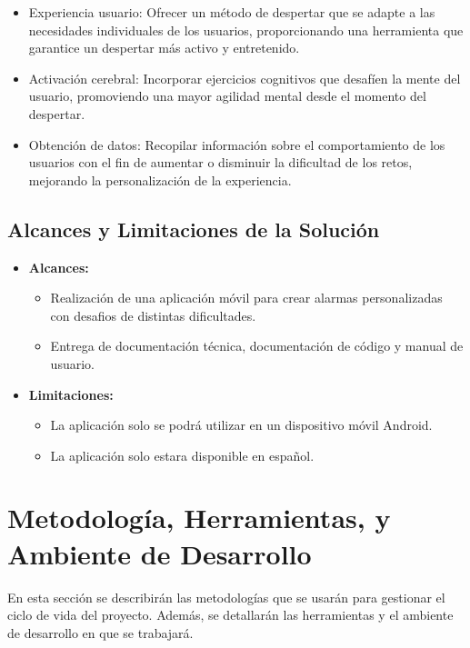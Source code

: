 \documentclass[letterpaper, 10pt]{article}
\begin{document}
\begin{itemize}
    \item Experiencia usuario: Ofrecer un método de despertar que se adapte a las necesidades individuales de los usuarios, proporcionando una herramienta que garantice un despertar más activo y entretenido.
    \item Activación cerebral: Incorporar ejercicios cognitivos que desafíen la mente del usuario, promoviendo una mayor agilidad mental desde el momento del despertar.
    \item Obtención de datos: Recopilar información sobre el comportamiento de los usuarios con el fin de aumentar o disminuir la dificultad de los retos, mejorando la personalización de la experiencia.
\end{itemize}

\subsection{Alcances y Limitaciones de la Solución}
\begin{itemize}
    \item \textbf{Alcances:}
    \begin{itemize}
        \item Realización de una aplicación móvil para crear alarmas personalizadas con desafios de distintas dificultades.
        \item  Entrega de documentación técnica, documentación de código y manual de usuario.
    \end{itemize}
    \item \textbf{Limitaciones:}
     \begin{itemize}
        \item La aplicación solo se podrá utilizar en un dispositivo móvil Android.
        \item La aplicación solo estara disponible en español.
    \end{itemize}
    
\end{itemize}

\section{Metodología, Herramientas, y Ambiente de Desarrollo}
En esta sección se describirán las metodologías que se usarán para gestionar el ciclo de vida del proyecto. Además, se detallarán las herramientas y el ambiente de desarrollo en que se trabajará.
\end{document}
